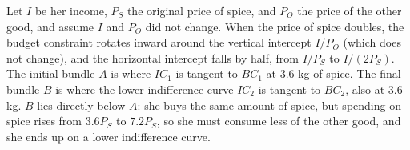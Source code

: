 \documentclass[11pt, a4]{exam}
\begin{document}
\begin{questions}
\begin{parts}
\begin{solution}[1in]
\begin{center}
\end{center}
Let $I$ be her income, $P_S$ the original price of spice, and $P_O$ the price of the other good, and assume $I$ and $P_O$ did not change. When the price of spice doubles, the budget constraint rotates inward around the vertical intercept $I/P_O$ (which does not change), and the horizontal intercept falls by half, from $I/P_S$ to $I/(2P_S)$. The initial bundle $A$ is where $IC_1$ is tangent to $BC_1$ at 3.6 kg of spice. The final bundle $B$ is where the lower indifference curve $IC_2$ is tangent to $BC_2$, also at 3.6 kg. $B$ lies directly below $A$: she buys the same amount of spice, but spending on spice rises from $3.6P_S$ to $7.2P_S$, so she must consume less of the other good, and she ends up on a lower indifference curve.
\end{solution}

\bigskip

\bigskip

\bigskip

\bigskip

\bigskip

\bigskip

\bigskip

\bigskip

\bigskip

\bigskip

\bigskip

\bigskip

\bigskip

\bigskip

\bigskip


\end{parts}
\end{questions}
\end{document}
